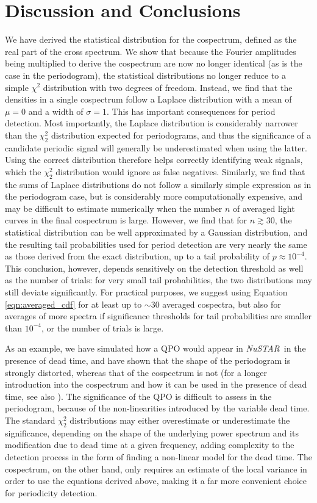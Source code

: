 \documentclass[12pt]{emulateapj}
\newcommand{\project}[1]{\textsl{#1}}
\newcommand{\nustar}{\project{NuSTAR}\xspace}
\begin{document}
\section{Discussion and Conclusions}
\label{sec:discussion}
We have derived the statistical distribution for the cospectrum, defined as the real part of the cross spectrum. We show that because the Fourier amplitudes being multiplied to derive the cospectrum are now no longer identical (as is the case in the periodogram), the statistical distributions no longer reduce to a simple $\chi^2$ distribution with two degrees of freedom. Instead, we find that the densities in a single cospectrum follow a Laplace distribution with a mean of $\mu=0$ and a width of $\sigma=1$. This has important consequences for period detection. Most importantly, the Laplace distribution is considerably narrower than the $\chi^2_2$ distribution expected for periodograms, and thus the significance of a candidate periodic signal will generally be underestimated when using the latter. Using the correct distribution therefore helps correctly identifying weak signals, which the $\chi^2_2$ distribution would ignore as false negatives. 
Similarly, we find that the sums of Laplace distributions do not follow a similarly simple expression as in the periodogram case, but is considerably more computationally expensive, and may be difficult to estimate numerically when the number $n$ of averaged light curves in the final cospectrum is large. However, we find that for $n \gtrsim 30$, the statistical distribution can be well approximated by a Gaussian distribution, and the resulting tail probabilities used for period detection are very nearly the same as those derived from the exact distribution, up to a tail probability of $p \approx 10^{-4}$. This conclusion, however, depends sensitively on the detection threshold as well as the number of trials: for very small tail probabilities, the two distributions may still deviate significantly. For practical purposes, we suggest using Equation \ref{eqn:averaged_cdf} for at least up to $\sim$30 averaged cospectra, but also for averages of more spectra if significance thresholds for tail probabilities are smaller than $10^{-4}$, or the number of trials is large. 

As an example, we have simulated how a QPO would appear in \nustar\ in the presence of dead time, and have shown that the shape of the periodogram is strongly distorted, whereas that of the cospectrum is not (for a longer introduction into the cospectrum and how it can be used in the presence of dead time, see also \citealt{Bachetti+15}). The significance of the QPO is difficult to assess in the periodogram, because of the non-linearities introduced by the variable dead time. The standard $\chi^2_2$ distributions may either overestimate or underestimate the significance, depending on the shape of the underlying power spectrum and its modification due to dead time at a given frequency, adding complexity to the detection process in the form of finding a non-linear model for the dead time. The cospectrum, on the other hand, only requires an estimate of the local variance in order to use the equations derived above, making it a far more convenient choice for periodicity detection. 
\end{document}
